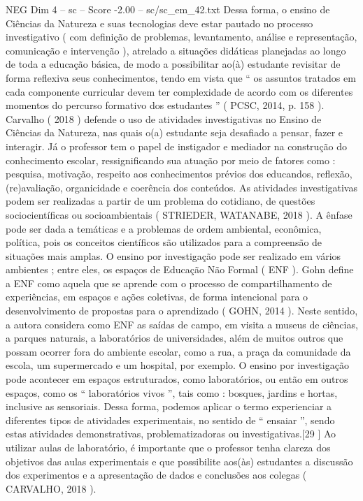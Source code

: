 \begin{textsample}{NEG Dim 4 – sc – Score -2.00 – sc/sc\_em\_42.txt}
Dessa forma, o ensino de Ciências da Natureza e suas tecnologias deve estar pautado no processo investigativo ( com definição de problemas, levantamento, análise e representação, comunicação e intervenção ), atrelado a situações didáticas planejadas ao longo de toda a educação básica, de modo a possibilitar ao(à) estudante revisitar de forma reflexiva seus conhecimentos, tendo em vista que “ os assuntos tratados em cada componente curricular devem ter complexidade de acordo com os diferentes momentos do percurso formativo dos estudantes ” ( PCSC, 2014, p. 158 ).
Carvalho ( 2018 ) defende o uso de atividades investigativas no Ensino de Ciências da Natureza, nas quais o(a) estudante seja desafiado a pensar, fazer e interagir.
Já o professor tem o papel de instigador e mediador na construção do conhecimento escolar, ressignificando sua atuação por meio de fatores como : pesquisa, motivação, respeito aos conhecimentos prévios dos educandos, reflexão, (re)avaliação, organicidade e coerência dos conteúdos.
As atividades investigativas podem ser realizadas a partir de um problema do cotidiano, de questões sociocientíficas ou socioambientais ( STRIEDER, WATANABE, 2018 ).
A ênfase pode ser dada a temáticas e a problemas de ordem ambiental, econômica, política, pois os conceitos científicos são utilizados para a compreensão de situações mais amplas.
O ensino por investigação pode ser realizado em vários ambientes ; entre eles, os espaços de Educação Não Formal ( ENF ).
Gohn define a ENF como aquela que se aprende com o processo de compartilhamento de experiências, em espaços e ações coletivas, de forma intencional para o desenvolvimento de propostas para o aprendizado ( GOHN, 2014 ).
Neste sentido, a autora considera como ENF as saídas de campo, em visita a museus de ciências, a parques naturais, a laboratórios de universidades, além de muitos outros que possam ocorrer fora do ambiente escolar, como a rua, a praça da comunidade da escola, um supermercado e um hospital, por exemplo.
O ensino por investigação pode acontecer em espaços estruturados, como laboratórios, ou então em outros espaços, como os “ laboratórios vivos ”, tais como : bosques, jardins e hortas, inclusive as sensoriais.
Dessa forma, podemos aplicar o termo experienciar a diferentes tipos de atividades experimentais, no sentido de “ ensaiar ”, sendo estas atividades demonstrativas, problematizadoras ou investigativas.[29 ] Ao utilizar aulas de laboratório, é importante que o professor tenha clareza dos objetivos das aulas experimentais e que possibilite aos(às) estudantes a discussão dos experimentos e a apresentação de dados e conclusões aos colegas ( CARVALHO, 2018 ).

\end{textsample}
